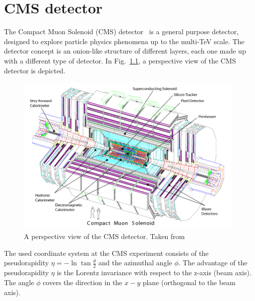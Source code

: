 \FloatBarrier
\chapter{CMS detector}
The Compact Muon Solenoid (CMS) detector~\cite{bib:CMS:experiment,bib:CMS:TDR} is a general purpose detector, designed to explore particle physics phenomena up to the multi-TeV scale.
The detector concept is an onion-like structure of different layers, each one made up with a different type of detector.
In Fig.~\ref{fig:CMSdetector}, a perspective view of the CMS detector is depicted. 
\begin{figure}[!b]
  \centering
      \includegraphics[width=0.99\textwidth]{figures/experiment/CMS/cms_complete_labelled.png}
  \caption{A perspective view of the CMS detector. Taken from~\cite{bib:CMS:experiment}}  
  \label{fig:CMSdetector}
\end{figure}
The used coordinate system at the CMS experiment consists of the pseudorapidity $\eta = -\ln \tan{\frac{\theta}{2}}$ and the azimuthal angle $\phi$.
The advantage of the pseudorapidity $\eta$ is the Lorentz invariance with respect to the z-axis (beam axis).
The angle $\phi$ covers the direction in the $x-y$ plane (orthogonal to the beam axis).

